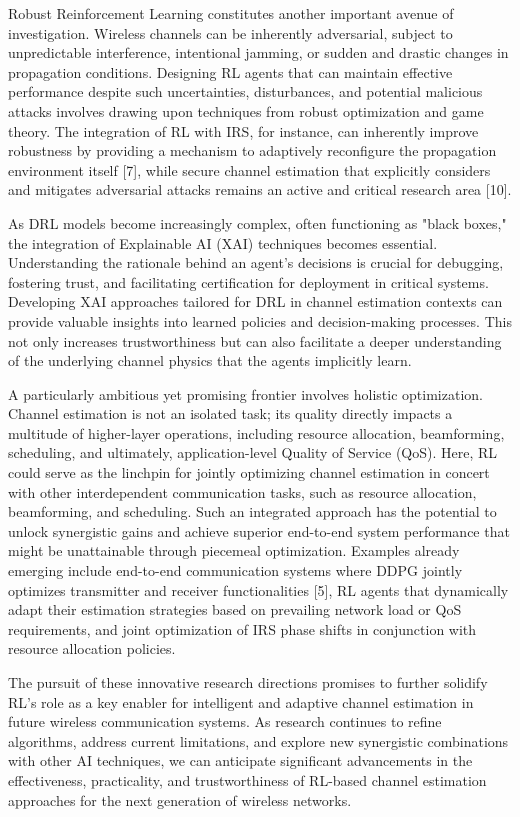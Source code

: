 \documentclass[journal,twocolumn]{IEEEtran}
\begin{document}
Robust Reinforcement Learning constitutes another important avenue of investigation. Wireless channels can be inherently adversarial, subject to unpredictable interference, intentional jamming, or sudden and drastic changes in propagation conditions. Designing RL agents that can maintain effective performance despite such uncertainties, disturbances, and potential malicious attacks involves drawing upon techniques from robust optimization and game theory. The integration of RL with IRS, for instance, can inherently improve robustness by providing a mechanism to adaptively reconfigure the propagation environment itself [7], while secure channel estimation that explicitly considers and mitigates adversarial attacks remains an active and critical research area [10].

As DRL models become increasingly complex, often functioning as "black boxes," the integration of Explainable AI (XAI) techniques becomes essential. Understanding the rationale behind an agent's decisions is crucial for debugging, fostering trust, and facilitating certification for deployment in critical systems. Developing XAI approaches tailored for DRL in channel estimation contexts can provide valuable insights into learned policies and decision-making processes. This not only increases trustworthiness but can also facilitate a deeper understanding of the underlying channel physics that the agents implicitly learn.

A particularly ambitious yet promising frontier involves holistic optimization. Channel estimation is not an isolated task; its quality directly impacts a multitude of higher-layer operations, including resource allocation, beamforming, scheduling, and ultimately, application-level Quality of Service (QoS). Here, RL could serve as the linchpin for jointly optimizing channel estimation in concert with other interdependent communication tasks, such as resource allocation, beamforming, and scheduling. Such an integrated approach has the potential to unlock synergistic gains and achieve superior end-to-end system performance that might be unattainable through piecemeal optimization. Examples already emerging include end-to-end communication systems where DDPG jointly optimizes transmitter and receiver functionalities [5], RL agents that dynamically adapt their estimation strategies based on prevailing network load or QoS requirements, and joint optimization of IRS phase shifts in conjunction with resource allocation policies.

The pursuit of these innovative research directions promises to further solidify RL's role as a key enabler for intelligent and adaptive channel estimation in future wireless communication systems. As research continues to refine algorithms, address current limitations, and explore new synergistic combinations with other AI techniques, we can anticipate significant advancements in the effectiveness, practicality, and trustworthiness of RL-based channel estimation approaches for the next generation of wireless networks.
\end{document}
